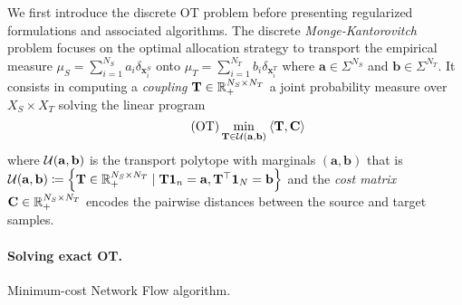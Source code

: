 We first introduce the discrete OT problem before presenting regularized formulations and associated algorithms.
 The discrete \emph{Monge-Kantorovitch} problem \citep{kantorovich1942transfer} focuses on the optimal allocation strategy to transport the empirical measure $\mu_S = \sum_{i=1}^{N_S} a_i  \delta_{\bm{x}_i^S}$ onto $\mu_T = \sum_{i=1}^{N_T} b_i  \delta_{\bm{x}_i^T}$ where $\bm{a} \in \Sigma^{N_S}$ and $\bm{b} \in \Sigma^{N_T}$. It consists in computing a \emph{coupling} ${\mathbf{T}} \in \mathbb{R}_{+}^{N_S \times N_T}$ \ie a joint probability measure over $X_S \times X_T$ solving the linear program
\begin{equation}
    \tag{OT}
    \label{eq:OT}
    \min_{{\mathbf{T}} \in {\mathcal{U}}({\mathbf{a}}, {\mathbf{b}})} \: \langle {\mathbf{T}}, {\mathbf{C}} \rangle
\end{equation}
where ${\mathcal{U}}({\mathbf{a}}, {\mathbf{b}})$ is the transport polytope with marginals $(\bm{a}, \bm{b})$ that is ${\mathcal{U}}({\mathbf{a}}, {\mathbf{b}}) \coloneqq \left\{ {\mathbf{T}} \in \mathbb{R}_+^{N_S \times N_T} \mid {\mathbf{T}} \mathbf{1}_n = {\mathbf{a}}, {\mathbf{T}}^\top \mathbf{1}_N = {\mathbf{b}} \right\}$ and the \emph{cost matrix} $\mathbf{C} \in \mathbb{R}_+^{N_S \times N_T}$ encodes the pairwise distances between the source and target samples. 

\paragraph{Solving exact OT.} Minimum-cost Network Flow algorithm. 


